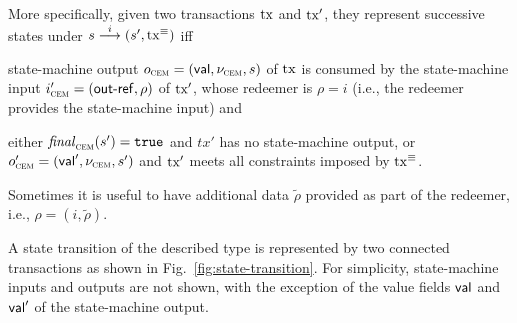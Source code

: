 More specifically, given two transactions $\mathrm{tx}$ and $\mathrm{tx}'$, they represent successive states under \({s}\overset{i}\longrightarrow(s', \mathrm{tx}^\equiv)\) iff 

\begin{mitemize}
  \item state-machine output $o_{\textsc{cem}} = (\mathsf{val}, \nu_{\textsc{cem}}, s)$ of $\mathrm{tx}$
  is consumed by the state-machine input $i_{\textsc{cem}}' = (\mathsf{out\textsf{-}{}ref}, \rho)$
  of $\mathrm{tx}'$, whose redeemer is \(\rho = i\) (i.e., the redeemer
  provides the state-machine input) and
  \item either $\mathit{final}_{\textsc{cem}}(s') = \mathtt{true}$ and $tx'$ has no state-machine
  output, or $o_{\textsc{cem}}' = (\mathsf{val}', \nu_{\textsc{cem}}, s')$ and $\mathrm{tx}'$ meets all
  constraints imposed by $\mathrm{tx}^\equiv$.
\end{mitemize}
Sometimes it is useful to have additional data $\tilde \rho$ provided
as part of the redeemer, i.e., $\rho = (i,\tilde \rho)$.

A state transition of the described type is represented by two connected
transactions as shown in Fig.~\ref{fig:state-transition}.  For
simplicity, state-machine inputs and outputs are not shown, with the
exception of the value fields $\mathsf{val}$ and $\mathsf{val}'$ of the state-machine output.


